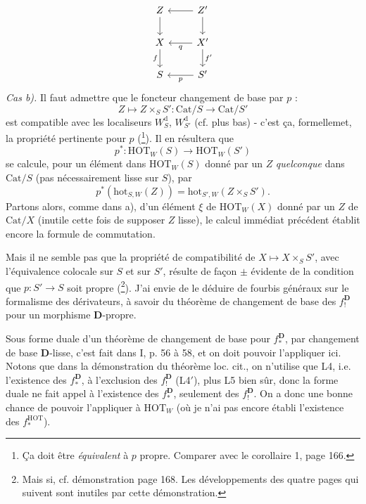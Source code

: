 \documentclass[11pt]{article}
\newcommand{\printedpage}[1]{\marginpar{\footnotesize p.~#1}}
\newcommand{\msp}[1]{\marginpar{\footnotesize [#1]}}
\newcommand{\HOT}{\mathrm{HOT}}
\newcommand{\hot}{\mathrm{hot}}
\newcommand{\Cat}{\mathrm{Cat}}
\newcommand{\D}{\mathbf{D}}
\begin{document}
\noindent\printedpage{100}%
\[
\begin{tikzcd}
Z \arrow[d] & Z' \arrow[l] \arrow[d] \\
X \arrow[d, "f"'] & X' \arrow[l, "q"] \arrow[d, "f'"] \\
S & S' \arrow[l, "p"]
\end{tikzcd}
\]
\textit{Cas b).} Il faut admettre que \msp{page 163}le foncteur changement de base par $p$ :
\[
Z \longmapsto Z \times_S S' : \Cat/S \longrightarrow \Cat/S'
\]
est compatible avec les localiseurs $W^{\mathrm{d}}_{S}$, $W^{\mathrm{d}}_{S'}$ (cf. plus bas) - c'est ça, formellemet, la propriété pertinente pour $p$ (\footnote[79]{Ça doit être \textit{équivalent} à $p$ propre. Comparer avec le corollaire 1, page 166.}). Il en résultera que %
\[
p^* : \HOT_W(S) \longrightarrow \HOT_W(S')
\]
se calcule, pour un élément dans $\HOT_W(S)$ donné par un $Z$ \textit{quelconque} dans $\Cat/S$ (pas nécessairement lisse sur $S$), par
\[
p^*(\hot_{S,W}(Z)) = \hot_{S',W}(Z \times_S S').
\]
Partons alors, comme dans a), d'un élément $\xi$ de $\HOT_W(X)$ donné par un $Z$ de $\Cat/X$ (inutile cette fois de supposer $Z$ lisse), le calcul immédiat précédent établit encore la formule de commutation.

Mais il ne semble pas que la propriété de compatibilité de $X \longmapsto X \times_S S'$, avec l'équivalence colocale sur $S$ et sur $S'$, résulte de façon $\pm$ évidente de la condition que $p : S' \longrightarrow S$ soit propre (\footnote[80]{Mais si, cf. démonstration page 168. Les développements des quatre pages qui suivent sont inutiles par cette démonstration.}). J'ai envie de le déduire de fourbis généraux sur le formalisme des dérivateurs, à savoir du théorème de changement de base des $f_!^{\D}$ pour un morphisme $\D$-propre.

\msp{page 164}Sous forme duale d'un théorème de changement de base pour $f_*^{\D}$, par changement de base $\D$-lisse, c'est fait dans I, p. 56 à 58, et on doit pouvoir l'appliquer ici. Notons que dans la démonstration du théorème loc. cit., on n'utilise que L4, i.e. l'existence des $f_*^{\D}$, à l'exclusion des $f_!^{\D}$ (L4$'$), plus L5 bien sûr, donc la forme duale ne fait appel à l'existence des $f_*^{\D}$, seulement des $f_!^{\D}$. On a donc une bonne chance de pouvoir l'appliquer à $\HOT_W$ (où je n'ai pas encore établi l'existence des $f_*^{\mathrm{HOT}}$). %
\end{document}
